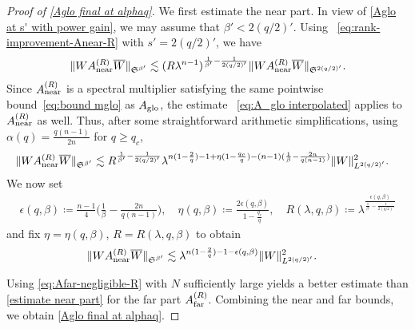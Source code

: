 \documentclass[12pt,reqno,a4paper]{amsart}
\newcommand\eps{\epsilon}
\begin{document}
\begin{proof}[Proof of \eqref{Aglo final at alphaq}]
We first estimate the near part. In view of \eqref{Aglo at s' with power gain}, we may assume that \(\beta'<2(q/2)'\). Using
  ~\eqref{eq:rank-improvement-Anear-R} with 
 \(s'=2(q/2)'\),  we have
  \begin{align}
    \|WA_{\rm near}^{(R)}\overline{W}\|_{\mathfrak{S}^{\beta'}}
    \lesssim
    (R\lambda^{n-1})^{\frac1{\beta'}-\frac1{2(q/2)'}}
    \|WA_{\rm near}^{(R)}\overline{W}\|_{\mathfrak{S}^{2(q/2)'}}.
  \end{align}
  Since \(A_{\rm near}^{(R)}\) is a spectral multiplier satisfying the same pointwise
  bound~\eqref{eq:bound mglo} as \(A_{\rm glo}\), the estimate
  ~\eqref{eq:A_glo interpolated} applies to \(A_{\rm near}^{(R)}\) as well. Thus, after some straightforward arithmetic simplifications, using $\alpha(q)=\frac{q(n-1)}{2n}$ for $q\geq q_c$, 
  \begin{align*}
    \|WA_{\rm near}^{(R)}\overline{W}\|_{\mathfrak{S}^{\beta'}}
    &\lesssim
    R^{\frac1{\beta'}-\frac1{2(q/2)'}}
    \lambda^{n(1-\frac{2}{q})-1+\eta(1-\frac{q_c}{q})-(n-1)(\frac{1}{\beta}-\frac{2n}{q(n-1)})}
    \|W\|^2_{L^{2(q/2)'}}.
  \end{align*}
We now set 
  \begin{align*}
\eps(q,\beta)\coloneqq \frac{n-1}{4}\Big(\frac{1}{\beta}-\frac{2n}{q(n-1)}\Big),\quad 
\eta(q,\beta)\coloneqq \frac{2\eps(q,\beta)}{1-\frac{q_c}{q}},\quad R(\lambda,q,\beta)\coloneqq \lambda^{\frac{\eps(q,\beta)}{\frac{1}{\beta'}-\frac{1}{2(q/2)'}}}
  \end{align*}
  and fix $\eta=\eta(q,\beta)$, $R=R(\lambda,q,\beta)$ to obtain
  \begin{align}\label{estimate near part}
    \|WA_{\rm near}^{(R)}\overline{W}\|_{\mathfrak{S}^{\beta'}}
    &\lesssim
    \lambda^{n(1-\frac{2}{q})-1-\eps(q,\beta)}
    \|W\|^2_{L^{2(q/2)'}}.
  \end{align}
  
  Using \eqref{eq:Afar-negligible-R} with $N$ sufficiently large yields a better estimate than \eqref{estimate near part} for the far part $A_{\rm far}^{(R)}$. 
Combining the near and far bounds, we obtain \eqref{Aglo final at alphaq}.
\end{proof}
\end{document}
